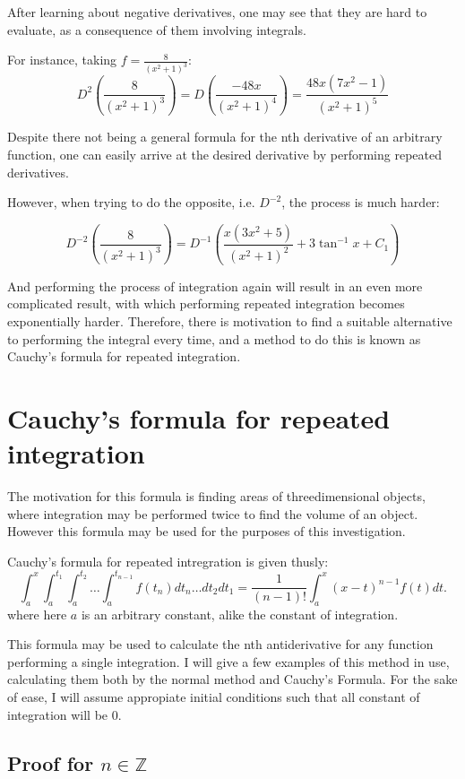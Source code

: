 \documentclass{article}
\begin{document}
After learning about negative derivatives, one may see that they are hard to
evaluate, as a consequence of them involving integrals.

For instance, taking $f = \frac{8}{(x^2+1)^3}$:
$$
D^2\left(\frac{8}{(x^2+1)^3}\right) =
D\left(\frac{-48x}{(x^2+1)^4}\right) =
\frac{48x(7x^2-1)}{(x^2+1)^5}
$$

Despite there not being a general formula for the nth derivative of an
arbitrary function, one can easily arrive at the desired derivative by
performing repeated derivatives.

However, when trying to do the opposite, i.e. $D^{-2}$, the process is much
harder:

$$
D^{-2}\left(\frac{8}{(x^2+1)^3}\right) =
D^{-1}\left(\frac{x\left(3x^2+5\right)}{\left(x^2+1\right)^2} +
3\tan^{-1}{x} + C_1 \right)
$$

And performing the process of integration again will result in an even more
complicated result, with which performing repeated integration becomes
exponentially harder. Therefore, there is motivation to find a suitable
alternative to performing the integral every time, and a method to do this is
known as Cauchy's formula for repeated integration.

\section{Cauchy's formula for repeated integration}

The motivation for this formula is finding areas of threedimensional objects,
where integration may be performed twice to find the volume of an
object. However this formula may be used for the purposes of this investigation.

Cauchy's formula for repeated intregration is given thusly:
$$
\int_a^x
\int_a^{t_1}
\int_a^{t_2}
\ldots
\int_a^{t_{n-1}}f\left(t_n\right) dt_n \ldots dt_2 dt_1
=
\frac{1}{(n-1)!}\int_a^x\left(x-t\right)^{n-1}f\left(t\right)dt.
$$
where here $a$ is an arbitrary constant, alike the constant of integration.

This formula may be used to calculate the nth antiderivative for any function
performing a single integration. I will give a few examples of this method in
use, calculating them both by the normal method and Cauchy's Formula. For the
sake of ease, I will assume appropiate initial conditions such that all
constant of integration will be $0$.


\subsection{Proof for $n \in \mathbb{Z}$}
\end{document}
